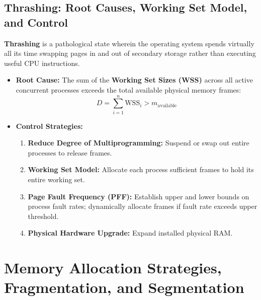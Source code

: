 \subsection{Thrashing: Root Causes, Working Set Model, and Control}
\textbf{Thrashing} is a pathological state wherein the operating system spends virtually all its time swapping pages in and out of secondary storage rather than executing useful CPU instructions.
\begin{itemize}
    \item \textbf{Root Cause:} The sum of the \textbf{Working Set Sizes (WSS)} across all active concurrent processes exceeds the total available physical memory frames:
    \begin{equation}
    D = \sum_{i=1}^{n} \text{WSS}_i > m_{\text{available}}
    \end{equation}
    \item \textbf{Control Strategies:}
    \begin{enumerate}
        \item \textbf{Reduce Degree of Multiprogramming:} Suspend or swap out entire processes to release frames.
        \item \textbf{Working Set Model:} Allocate each process sufficient frames to hold its entire working set.
        \item \textbf{Page Fault Frequency (PFF):} Establish upper and lower bounds on process fault rates; dynamically allocate frames if fault rate exceeds upper threshold.
        \item \textbf{Physical Hardware Upgrade:} Expand installed physical RAM.
    \end{enumerate}
\end{itemize}



\section{Memory Allocation Strategies, Fragmentation, and Segmentation}
\label{sec:os_memory_allocation}

